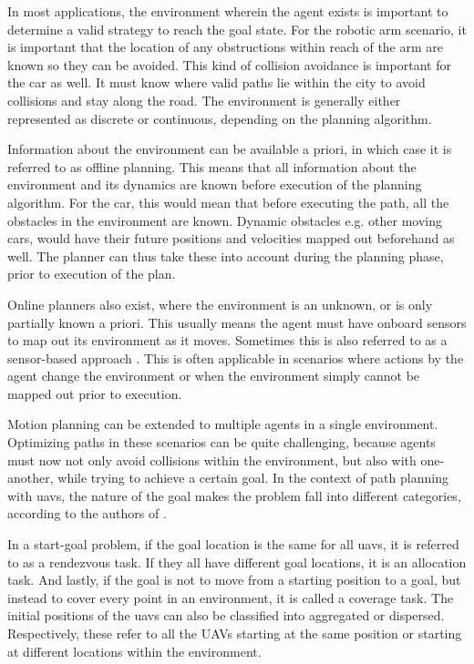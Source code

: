 In most applications, the environment wherein the agent exists is important to determine a valid strategy to reach the goal state. For the robotic arm scenario, it is important that the location of any obstructions within reach of the arm are known so they can be avoided. This kind of collision avoidance is important for the car as well. It must know where valid paths lie within the city to avoid collisions and stay along the road. The environment is generally either represented as discrete or continuous, depending on the planning algorithm.

Information about the environment can be available a priori, in which case it is referred to as offline planning. This means that all information about the environment and its dynamics are known before execution of the planning algorithm. For the car, this would mean that before executing the path, all the obstacles in the environment are known. Dynamic obstacles e.g. other moving cars, would have their future positions and velocities mapped out beforehand as well. The planner can thus take these into account during the planning phase, prior to execution of the plan. 

Online planners also exist, where the environment is an unknown, or is only partially known a priori. This usually means the agent must have onboard sensors to map out its environment as it moves. Sometimes this is also referred to as a sensor-based approach \cite{Choset2001}. This is often applicable in scenarios where actions by the agent change the environment or when the environment simply cannot be mapped out prior to execution.

Motion planning can be extended to multiple agents in a single environment. Optimizing paths in these scenarios can be quite challenging, because agents must now not only avoid collisions within the environment, but also with one-another, while trying to achieve a certain goal. In the context of path planning with \acsp{uav}, the nature of the goal makes the problem fall into different categories, according to the authors of \cite{Zhang2020}. 

In a start-goal problem, if the goal location is the same for all \acsp{uav}, it is referred to as a rendezvous task. If they all have different goal locations, it is an allocation task. And lastly, if the goal is not to move from a starting position to a goal, but instead to cover every point in an environment, it is called a coverage task. The initial positions of the \acsp{uav} can also be  classified into aggregated or dispersed. Respectively, these refer to all the UAVs starting at the same position or starting at different locations within the environment.

